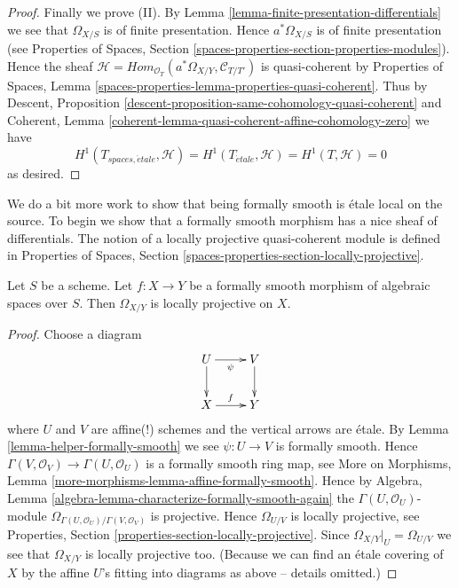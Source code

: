 \begin{proof}
\medskip\noindent
Finally we prove (II). By
Lemma \ref{lemma-finite-presentation-differentials}
we see that $\Omega_{X/S}$ is of finite presentation.
Hence $a^*\Omega_{X/S}$ is of finite presentation (see
Properties of Spaces,
Section \ref{spaces-properties-section-properties-modules}).
Hence the sheaf
$\mathcal{H} =
\textit{Hom}_{\mathcal{O}_T}(a^*\Omega_{X/Y}, \mathcal{C}_{T/T'})$
is quasi-coherent by
Properties of Spaces,
Lemma \ref{spaces-properties-lemma-properties-quasi-coherent}.
Thus by
Descent, Proposition \ref{descent-proposition-same-cohomology-quasi-coherent}
and
Coherent, Lemma \ref{coherent-lemma-quasi-coherent-affine-cohomology-zero}
we have
$$
H^1(T_{spaces, \acute{e}tale}, \mathcal{H}) =
H^1(T_{\acute{e}tale}, \mathcal{H}) =
H^1(T, \mathcal{H}) = 0
$$
as desired.
\end{proof}

\noindent
We do a bit more work to show that being formally smooth is \'etale local
on the source. To begin we show that a formally smooth morphism has a nice
sheaf of differentials. The notion of a locally projective quasi-coherent
module is defined in
Properties of Spaces,
Section \ref{spaces-properties-section-locally-projective}.

\begin{lemma}
\label{lemma-formally-smooth-sheaf-differentials}
Let $S$ be a scheme.
Let $f : X \to Y$ be a formally smooth morphism of algebraic spaces over $S$.
Then $\Omega_{X/Y}$ is locally projective on $X$.
\end{lemma}

\begin{proof}
Choose a diagram
$$
\xymatrix{
U \ar[d] \ar[r]_\psi & V \ar[d] \\
X \ar[r]^f & Y
}
$$
where $U$ and $V$ are affine(!) schemes and the vertical arrows are \'etale.
By
Lemma \ref{lemma-helper-formally-smooth}
we see $\psi : U \to V$ is formally smooth. Hence
$\Gamma(V, \mathcal{O}_V) \to \Gamma(U, \mathcal{O}_U)$ is
a formally smooth ring map, see
More on Morphisms, Lemma \ref{more-morphisms-lemma-affine-formally-smooth}.
Hence by
Algebra, Lemma \ref{algebra-lemma-characterize-formally-smooth-again}
the $\Gamma(U, \mathcal{O}_U)$-module
$\Omega_{\Gamma(U, \mathcal{O}_U)/\Gamma(V, \mathcal{O}_V)}$
is projective. Hence $\Omega_{U/V}$ is locally projective, see
Properties, Section \ref{properties-section-locally-projective}.
Since $\Omega_{X/Y}|_U = \Omega_{U/V}$ we see that $\Omega_{X/Y}$ is
locally projective too. (Because we can find an \'etale covering of
$X$ by the affine $U$'s fitting into diagrams as above -- details
omitted.)
\end{proof}

